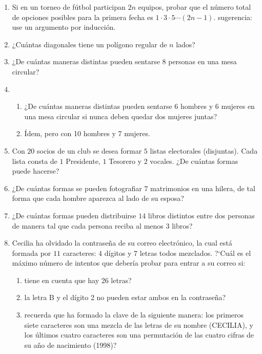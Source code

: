 \documentclass[a4paper,12pt,twoside,spanish,reqno]{amsbook}
\numberwithin{equation}{section}
\begin{document}
\begin{enumerate}[resume]

\item Si en un torneo de fútbol participan $2n$ equipos, probar que el número total de opciones posibles para la primera fecha es $1\cdot 3\cdot 5 \cdots (2n - 1)$. sugerencia: use un argumento por inducción.


\item ¿Cuántas diagonales tiene un polígono regular de $n$ lados?


\item ¿De cuántas maneras  distintas pueden sentarse 8 personas en una mesa \linebreak circular?


\item \begin{enumerate}
	\item ¿De cuántas maneras distintas pueden sentarse 6 hombres y 6 mujeres en una mesa circular si nunca deben quedar dos mujeres juntas?
	\item \'Idem, pero con 10 hombres y 7 mujeres.
\end{enumerate}


\item Con $20$ socios de un club se desea formar $5$ listas electorales (disjuntas).
Cada lista consta de $1$ Presidente, $1$ Tesorero y $2$ vocales.  ¿De cuántas
formas puede hacerse?


\item ¿De cuántas formas se pueden fotografiar $7$ matrimonios en una hilera,
de tal forma que cada hombre aparezca al lado de su esposa?


\item ¿De cuántas formas pueden distribuirse $14$ libros distintos entre dos
personas de manera tal que cada persona reciba al menos $3$ libros?

\item Cecilia ha olvidado la contraseña de su correo electrónico, la cual est\'a formada por $11$ caracteres: $4$ d\'igitos y $7$ letras todos mezclados. ?`Cu\'al es el m\'aximo n\'umero de intentos que deber\'ia probar para entrar a su correo si:
\begin{enumerate}
    \item  tiene en cuenta que hay 26 letras?
    
    \item la letra B y el d\'igito 2 no pueden estar ambos en la contraseña?
    
    \item  recuerda que ha formado la clave de la siguiente manera: los primeros siete caracteres son una mezcla de las letras de su nombre (CECILIA), y los \'ultimos cuatro caracteres son una permutaci\'on de las cuatro cifras de su a\~no de nacimiento (1998)?
\end{enumerate}


\end{enumerate}
\end{document}
